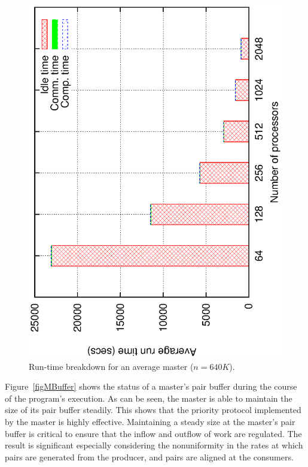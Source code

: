 \documentclass[10pt,journal,letterpaper,compsoc]{IEEEtran}
\begin{document}
\begin{figure}[thb]
\centerline{
						\includegraphics[angle=-90, scale=0.5]{msBreak.eps}
            }
\caption{
Run-time breakdown for an average master ($n=640K$).
}
\label{figMasterBreakdown}
\end{figure}


Figure~\ref{figMBuffer} shows the status of a master's pair buffer during the course of the program's execution. As can be seen, the master is able to maintain the size of its pair buffer steadily. This shows that the priority protocol implemented by the master is highly effective. Maintaining a steady size at the master's pair buffer is critical to ensure that the inflow and outflow of work are regulated. The result is significant especially considering the nonuniformity in the rates at which pairs are generated from the producer, and pairs are aligned at the consumers.
\end{document}
